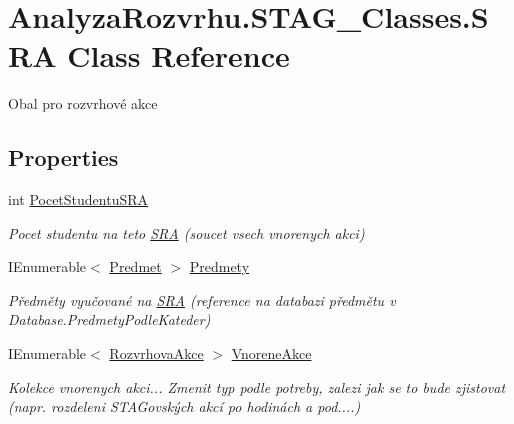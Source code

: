 \hypertarget{class_analyza_rozvrhu_1_1_s_t_a_g___classes_1_1_s_r_a}{}\section{Analyza\+Rozvrhu.\+S\+T\+A\+G\+\_\+\+Classes.\+S\+RA Class Reference}
\label{class_analyza_rozvrhu_1_1_s_t_a_g___classes_1_1_s_r_a}


Obal pro rozvrhové akce  


\subsection*{Properties}
\begin{DoxyCompactItemize}
\item 
int \hyperlink{class_analyza_rozvrhu_1_1_s_t_a_g___classes_1_1_s_r_a_a38c3deb8fa6a868fd545ef5959a88ce0}{Pocet\+Studentu\+S\+RA}
\begin{DoxyCompactList}\small\item\em Pocet studentu na teto \hyperlink{class_analyza_rozvrhu_1_1_s_t_a_g___classes_1_1_s_r_a}{S\+RA} (soucet vsech vnorenych akci) \end{DoxyCompactList}\item 
I\+Enumerable$<$ \hyperlink{class_analyza_rozvrhu_1_1_s_t_a_g___classes_1_1_predmet}{Predmet} $>$ \hyperlink{class_analyza_rozvrhu_1_1_s_t_a_g___classes_1_1_s_r_a_a4be68fba5727dbeedfbc591a27e062a8}{Predmety}
\begin{DoxyCompactList}\small\item\em Předměty vyučované na \hyperlink{class_analyza_rozvrhu_1_1_s_t_a_g___classes_1_1_s_r_a}{S\+RA} (reference na databazi předmětu v Database.\+Predmety\+Podle\+Kateder) \end{DoxyCompactList}\item 
I\+Enumerable$<$ \hyperlink{class_analyza_rozvrhu_1_1_s_t_a_g___classes_1_1_rozvrhova_akce}{Rozvrhova\+Akce} $>$ \hyperlink{class_analyza_rozvrhu_1_1_s_t_a_g___classes_1_1_s_r_a_ab1e34b548ffda5bad0b8d23c5a26316e}{Vnorene\+Akce}
\begin{DoxyCompactList}\small\item\em Kolekce vnorenych akci... Zmenit typ podle potreby, zalezi jak se to bude zjistovat (napr. rozdeleni S\+T\+A\+Govských akcí po hodinách a pod....) \end{DoxyCompactList}\end{DoxyCompactItemize}


